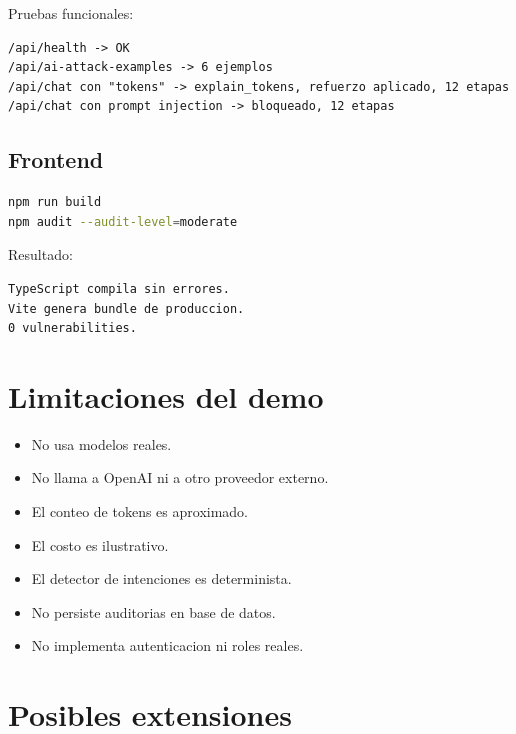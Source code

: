 \documentclass[12pt,letterpaper]{article}
\begin{document}
Pruebas funcionales:

\begin{lstlisting}[language={},caption={Pruebas funcionales backend}]
/api/health -> OK
/api/ai-attack-examples -> 6 ejemplos
/api/chat con "tokens" -> explain_tokens, refuerzo aplicado, 12 etapas
/api/chat con prompt injection -> bloqueado, 12 etapas
\end{lstlisting}

\subsection{Frontend}

\begin{lstlisting}[language=bash,caption={Comandos de validacion frontend}]
npm run build
npm audit --audit-level=moderate
\end{lstlisting}

Resultado:

\begin{lstlisting}[language={},caption={Resultado frontend}]
TypeScript compila sin errores.
Vite genera bundle de produccion.
0 vulnerabilities.
\end{lstlisting}

\section{Limitaciones del demo}

\begin{itemize}
  \item No usa modelos reales.
  \item No llama a OpenAI ni a otro proveedor externo.
  \item El conteo de tokens es aproximado.
  \item El costo es ilustrativo.
  \item El detector de intenciones es determinista.
  \item No persiste auditorias en base de datos.
  \item No implementa autenticacion ni roles reales.
\end{itemize}

\section{Posibles extensiones}
\end{document}
